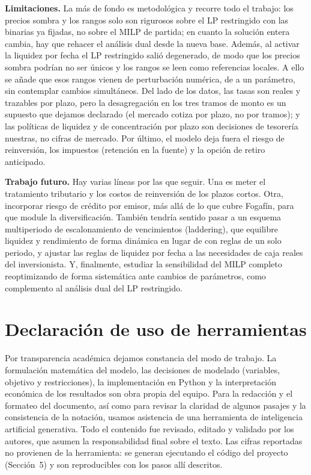 \documentclass[11pt,a4paper]{article}
\begin{document}
\textbf{Limitaciones.} La más de fondo es metodológica y recorre todo el trabajo: los precios
sombra y los rangos solo son rigurosos sobre el LP restringido con las binarias ya fijadas, no
sobre el MILP de partida; en cuanto la solución entera cambia, hay que rehacer el análisis dual
desde la nueva base. Además, al activar la liquidez por fecha el LP restringido salió
degenerado, de modo que los precios sombra podrían no ser únicos y los rangos se leen como
referencias locales. A ello se añade que esos rangos vienen de perturbación numérica, de a un
parámetro, sin contemplar cambios simultáneos. Del lado de los datos, las tasas son reales y
trazables por plazo, pero la desagregación en los tres tramos de monto es un supuesto que
dejamos declarado (el mercado cotiza por plazo, no por tramos); y las políticas de liquidez y de
concentración por plazo son decisiones de tesorería nuestras, no cifras de mercado. Por último,
el modelo deja fuera el riesgo de reinversión, los impuestos (retención en la fuente) y la
opción de retiro anticipado.

\textbf{Trabajo futuro.} Hay varias líneas por las que seguir. Una es meter el tratamiento
tributario y los costos de reinversión de los plazos cortos. Otra, incorporar riesgo de crédito
por emisor, más allá de lo que cubre Fogafín, para que module la diversificación. También
tendría sentido pasar a un esquema multiperiodo de escalonamiento de vencimientos (laddering),
que equilibre liquidez y rendimiento de forma dinámica en lugar de con reglas de un solo
periodo, y ajustar las reglas de liquidez por fecha a las necesidades de caja reales del
inversionista. Y, finalmente, estudiar la sensibilidad del MILP completo reoptimizando de forma
sistemática ante cambios de parámetros, como complemento al análisis dual del LP restringido.

\section{Declaración de uso de herramientas}

Por transparencia académica dejamos constancia del modo de trabajo. La formulación matemática
del modelo, las decisiones de modelado (variables, objetivo y restricciones), la implementación
en Python y la interpretación económica de los resultados son obra propia del equipo. Para la
redacción y el formateo del documento, así como para revisar la claridad de algunos pasajes y
la consistencia de la notación, usamos asistencia de una herramienta de inteligencia artificial
generativa. Todo el contenido fue revisado, editado y validado por los autores, que asumen la
responsabilidad final sobre el texto. Las cifras reportadas no provienen de la herramienta: se
generan ejecutando el código del proyecto (Sección~5) y son reproducibles con los pasos allí
descritos.
\end{document}
